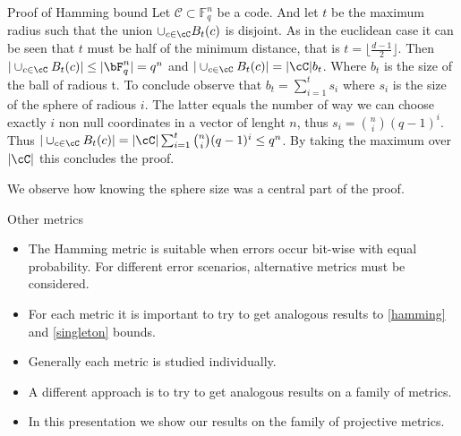 \begin{frame}{Proof of Hamming bound}
Let \(\mathcal{C} \subset \mathbb{F}_q^n\) be a code. And let \(t\) be the maximum radius such that the union \(\cup_{c \in \cC}B_t(c)\) is disjoint. As in the euclidean case it can be seen that \(t\) must be half of the minimum distance, that is \(t = \lfloor \frac{d-1}{2}\rfloor\). Then \(|\cup_{c \in \cC}B_t(c)|\leq |\bF_q^n|=q^n\) and \(|\cup_{c \in \cC}B_t(c)| = |\cC|b_t\). Where \(b_t\) is the size of the ball of radious t. To conclude observe that \(b_t = \sum_{i=1}^ts_i\) where \(s_i\) is the size of the sphere of radious \(i\). The latter equals the number of way we can choose exactly \(i\) non null coordinates in a vector of lenght \(n\), thus \(s_i = \binom{n}{i}(q-1)^i\). Thus \(|\cup_{c \in \cC}B_t(c)| = |\cC|\sum_{i=1}^t \binom{n}{i}(q-1)^i \leq q^n \). By taking the maximum over \(|\cC|\) this concludes the proof.


\vspace{2cm}
We observe how knowing the sphere size was a central part of the proof.
\end{frame}

\begin{frame}{Other metrics}
   \begin{itemize}
   \item The Hamming metric is suitable when errors occur bit-wise with equal probability. For different error scenarios, alternative metrics must be considered. 
   
   \item
   For each metric it is important to try to get analogous results to \ref{hamming}  and \ref{singleton} bounds. 
   \item
   Generally each metric is studied individually.
   
   \item
   A different approach is to try to get analogous results on a family of metrics.
   \item In this presentation we show our results on the family of projective metrics.
   \end{itemize}
\end{frame}